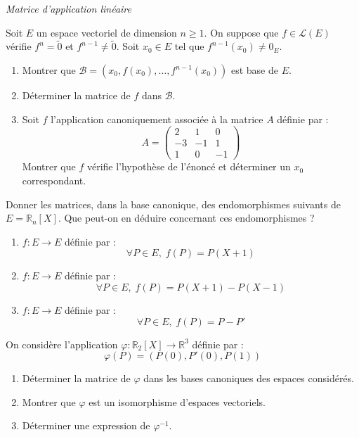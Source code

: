 \documentclass[a4paper,10pt]{report}
\begin{document}
 \medskip

\begin{center}
\textit{{ {\large Matrice d'application linéaire}}}
\end{center}

\medskip





\begin{Exa} Soit $E$ un espace vectoriel de dimension $n \geq 1$. On suppose que $f \in \mathcal{L}(E)$ vérifie $f^n = \tilde{0}$ et $f^{n-1} \neq \tilde{0}$. Soit $x_0 \in E$ tel que $f^{n-1}(x_0) \neq 0_E$.

\begin{enumerate}
\item Montrer que $\mathcal{B}= (x_0, f(x_0), \ldots, f^{n-1}(x_0))$ est base de $E$. 
\item Déterminer la matrice de $f$ dans $\mathcal{B}$.
\item Soit $f$ l'application canoniquement associée à la matrice $A$ définie par :
$$ A = \begin{pmatrix}
2 & 1 & 0 \\
-3 & -1 & 1 \\
1 & 0 & -1 
\end{pmatrix}$$
Montrer que $f$ vérifie l'hypothèse de l'énoncé et déterminer un $x_0$ correspondant.
\end{enumerate}
\end{Exa}

\begin{Exa} Donner les matrices, dans la base canonique, des endomorphismes suivants de $E=\mathbb{R}_n[X]$. Que peut-on en déduire concernant ces endomorphismes ?

\begin{enumerate}
\item $f : E \rightarrow E$ définie par :
$$ \forall P \in E, \; f(P) = P(X+1) $$
\item $f : E \rightarrow E$ définie par :
$$ \forall P \in E, \; f(P) = P(X+1)-P(X-1) $$
\item $f : E \rightarrow E$ définie par :
$$ \forall P \in E, \; f(P) = P-P' $$
\end{enumerate}
\end{Exa} 


\begin{Exa} On considère l'application $\varphi : \mathbb{R}_2[X] \rightarrow \mathbb{R}^3$ définie par :
\[ \varphi(P)=(P(0),P'(0),P(1)) \]

\begin{enumerate}
\item Déterminer la matrice de $\varphi$ dans les bases canoniques des espaces considérés.
\item Montrer que $\varphi$ est un isomorphisme d'espaces vectoriels.
\item Déterminer une expression de $\varphi^{-1}$.
\end{enumerate}
\end{Exa} 
\end{document}
